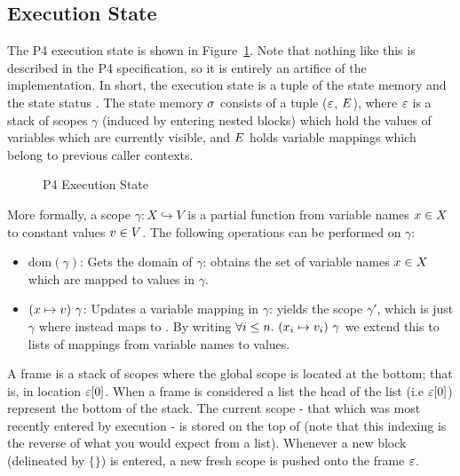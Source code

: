 \documentclass[UTF8]{article}
\begin{document}
\subsection{Execution State}

The P4 execution state is shown in Figure~\ref{fig:status}. Note that nothing like this is described in the P4 specification, so it is entirely an artifice of the \pfott{} implementation. In short, the execution state \exstate{} is a tuple of the state memory \stacks{} and the state status \status{}. The state memory $\sigma{}$ consists of a tuple ($\varepsilon$, $E$), where $\varepsilon$ is a stack of scopes $\gamma$ (induced by entering nested blocks) which hold the values of variables which are currently visible, and $E$ holds variable mappings which belong to previous caller contexts.

\begin{figure}[h!]
\centering\ottgrammartabular{
\ottstatus\ottinterrule
\ottstate\ottafterlastrule
}
\caption{P4 Execution State}
\label{fig:status}
\end{figure}

More formally, a scope $\gamma : X \hookrightarrow V$ is a partial function from variable names $x{} \in X$ to constant values $v{} \in V$. The following operations can be performed on $\gamma$:
\begin{itemize}
\item $\mathrm{dom} ( \gamma )$: Gets the domain of $\gamma$: obtains the set of variable names $x{} \in X$ which are mapped to values in $\gamma$.
\item $(x \mapsto  v) \,\, \gamma$: Updates a variable mapping in $\gamma$: yields the scope $\gamma'$, which is just $\gamma$ where \vn{} instead maps to \cval{}. By writing $\forall i \leq n. \,\, ({x}_i \mapsto  {\ensuremath{v}}_i) \,\, \gamma$ we extend this to lists of mappings from variable names to values.
\end{itemize}

A frame \currsf{} is a stack of scopes where the global scope \gscope{} is located at the bottom; that is, in location $\varepsilon [0]$.
When a frame is considered a list the head of the list (i.e $\varepsilon{} [0]$) represent the bottom of the stack.
The current scope - that which was most recently entered by execution - is stored on the top of \currsf{}  (note that this indexing is the reverse of what you would expect from a list). Whenever a new block (delineated by $\{ \}$) is entered, a new fresh scope \escope{} is pushed onto the frame $\varepsilon$. %
\end{document}
